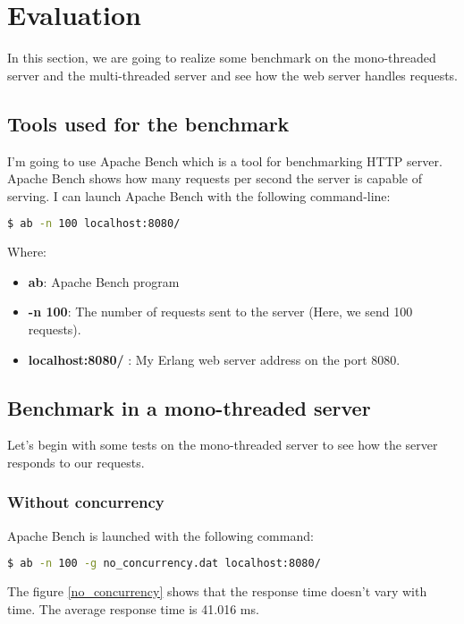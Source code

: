 \documentclass[a4paper, 11pt]{article}
\begin{document}
\section{Evaluation}

In this section, we are going to realize some benchmark on the mono-threaded server and the multi-threaded server and see how the web server handles  requests.

\subsection{Tools used for the benchmark}

I'm going to use Apache Bench which is a tool for benchmarking HTTP server. Apache Bench shows how many requests per second the server is capable of serving. I can launch Apache Bench with the following command-line:
\begin{lstlisting}[language=Bash]
$ ab -n 100 localhost:8080/
\end{lstlisting}
Where:
\begin{itemize}
\item \textbf{ab}: Apache Bench program
\item \textbf{-n 100}: The number of requests sent to the server (Here, we send 100 requests).
\item \textbf{localhost:8080/} : My Erlang web server address on the port 8080.
\end{itemize}

\subsection{Benchmark in a mono-threaded server}

Let's begin with some tests on the mono-threaded server to see how the server responds to our requests.



\subsubsection{Without concurrency}

Apache Bench is launched with the following command: 
\begin{lstlisting}[language=Bash]
$ ab -n 100 -g no_concurrency.dat localhost:8080/
\end{lstlisting} 
The figure \ref{no_concurrency} shows that the response time doesn't vary with time. 
The average response time is 41.016 ms.
\end{document}
